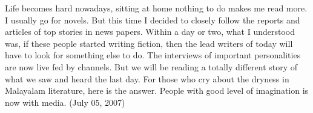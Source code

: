 \vskip 2pt


Life becomes hard nowadays, sitting at home nothing to do makes me read more.
I usually go for novels. But this time I decided to closely follow the 
reports and articles of top stories in news papers. Within a day or two, 
what I understood was, if these people started writing fiction, then the 
lead writers of today will have to look for something else to do. The interviews of 
important personalities are now live fed by channels. But we will be reading
 a totally different story of what we saw and heard the last day.
For those who cry about the dryness in Malayalam literature, here is the answer. 
People with good level of imagination is now with media. (July 05, 2007)
\newpage
